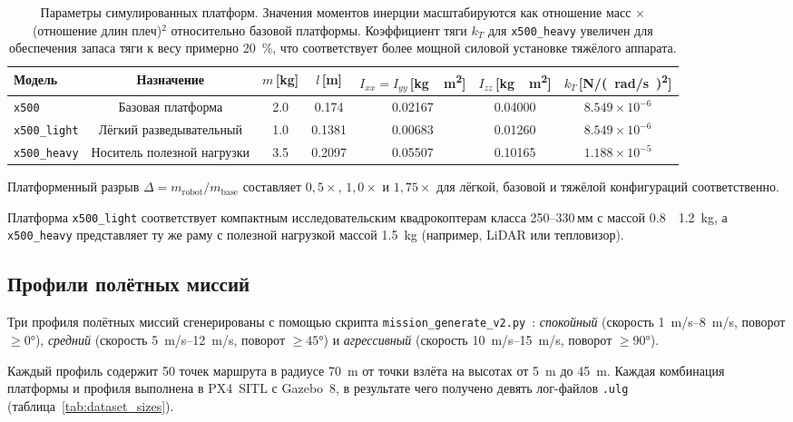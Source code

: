 \begin{table}[htbp]
	\centering
	\caption{Параметры симулированных платформ.
		Значения моментов инерции масштабируются как отношение масс $\times$ (отношение длин плеч)$^2$ относительно базовой платформы.
		Коэффициент тяги $k_T$ для \texttt{x500\_heavy} увеличен для обеспечения запаса тяги к весу примерно 20~\%, что соответствует более мощной силовой установке тяжёлого аппарата.}
	\label{tab:platforms}
	\begin{tabular}{lcccccc}
		\toprule
		\textbf{Модель} & \textbf{Назначение} &
		$m$\,[\si{kg}] & $l$\,[\si{m}] &
		$I_{xx}=I_{yy}$\,[\si{kg\cdot m^2}] & $I_{zz}$\,[\si{kg\cdot m^2}] &
		$k_T$\,[\si{N/(rad/s)^2}] \\
		\midrule
		\texttt{x500}        & Базовая платформа     & 2.0 & 0.174  & 0.02167 & 0.04000 & $8.549\times10^{-6}$ \\
		\texttt{x500\_light} & Лёгкий разведывательный & 1.0 & 0.1381 & 0.00683 & 0.01260 & $8.549\times10^{-6}$ \\
		\texttt{x500\_heavy} & Носитель полезной нагрузки & 3.5 & 0.2097 & 0.05507 & 0.10165 & $1.188\times10^{-5}$ \\
		\bottomrule
	\end{tabular}
\end{table}

Платформенный разрыв $\Delta = m_{\mathrm{robot}}/m_{\mathrm{base}}$ составляет $0{,}5\times$, $1{,}0\times$ и $1{,}75\times$ для лёгкой, базовой и тяжёлой конфигураций соответственно.

Платформа \texttt{x500\_light} соответствует компактным исследовательским квадрокоптерам класса 250–330\,мм с массой \SI{0.8}{\text{--}\SI{1.2}{kg}}, а \texttt{x500\_heavy} представляет ту же раму с полезной нагрузкой массой \SI{1.5}{kg} (например, LiDAR или тепловизор).

\subsection{Профили полётных миссий}
\label{subsec:mp_missions}

Три профиля полётных миссий сгенерированы с помощью скрипта \texttt{mission\_generate\_v2.py}~\cite{mission_gen_v2}:
\textit{спокойный} (скорость \SIrange{1}{8}{m/s}, поворот $\geq 0\si{\degree}$),
\textit{средний} (скорость \SIrange{5}{12}{m/s}, поворот $\geq 45\si{\degree}$) и
\textit{агрессивный} (скорость \SIrange{10}{15}{m/s}, поворот $\geq 90\si{\degree}$).

Каждый профиль содержит 50 точек маршрута в радиусе \SI{70}{m} от точки взлёта на высотах от \SI{5}{m} до \SI{45}{m}.
Каждая комбинация платформы и профиля выполнена в PX4~SITL с Gazebo~8, в результате чего получено девять лог-файлов \texttt{.ulg} (таблица~\ref{tab:dataset_sizes}).

